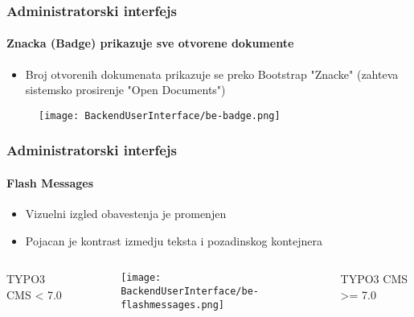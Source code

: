 \begin{frame}[fragile]
	\frametitle{Administratorski interfejs}
	\framesubtitle{Znacka (Badge) prikazuje sve otvorene dokumente}

	\begin{itemize}
		\item Broj otvorenih dokumenata prikazuje se preko Bootstrap "Znacke"\newline
			(zahteva sistemsko prosirenje "Open Documents")
	\end{itemize}
	\begin{figure}
		\texttt{[image: BackendUserInterface/be-badge.png]}
	\end{figure}

\end{frame}


\begin{frame}[fragile]
	\frametitle{Administratorski interfejs}
	\framesubtitle{Flash Messages}

	\begin{itemize}
		\item Vizuelni izgled obavestenja je promenjen 
		\item Pojacan je kontrast izmedju teksta i pozadinskog kontejnera
	\end{itemize}

	\begin{columns}[T]
		\begin{column}{.25\textwidth}
			\smaller\hfill 
				\begingroup\color{typo3red}TYPO3 CMS < 7.0\endgroup
			\normalsize
		\end{column}

		\begin{column}{.5\textwidth}
			\begin{figure}\vspace*{-0.6cm}
				\texttt{[image: BackendUserInterface/be-flashmessages.png]}
			\end{figure}
		\end{column}

		\begin{column}{.25\textwidth}
			\smaller
				\begingroup\color{typo3red}TYPO3 CMS >= 7.0\endgroup
			\normalsize
		\end{column}

	\end{columns}

\end{frame}

